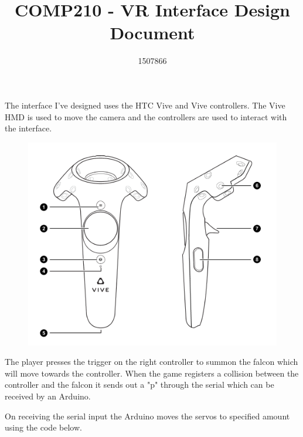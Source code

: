 \documentclass{scrartcl}
\title{COMP210 - VR Interface Design Document}
\author{1507866}
\begin{document}
	
\maketitle
The interface I've designed uses the HTC Vive and Vive controllers. The Vive HMD is used to move the camera and the controllers are used to interact with the interface.
\begin{figure}[h]
	\includegraphics[width=0.8\linewidth]{vive_controller.png}
	\caption{  }
\end{figure} 

The player presses the trigger on the right controller to summon the falcon which will move towards the controller. When the game registers a collision between the controller and the falcon it sends out a "p" through the serial which can be received by an Arduino. 

On receiving the serial input the Arduino moves the servos to specified amount using the code below.
\end{document}
